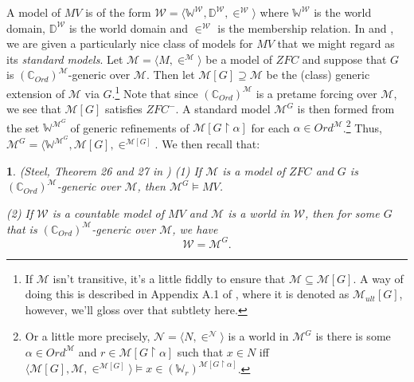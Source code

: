 \documentclass[10pt,a4paper]{amsart}
\numberwithin{equation}{section}
\numberwithin{figure}{section}
\theoremstyle{plain}
\theoremstyle{plain}
\newtheorem{fact}[thm]{\protect\factname}
\theoremstyle{plain}
\theoremstyle{plain}
\theoremstyle{remark}
\theoremstyle{plain}
\theoremstyle{definition}
\providecommand{\factname}{Fact}
\begin{document}
A model of $MV$ is of the form $\mathcal{W}=\langle\mathbb{W}^{\mathcal{W}},\mathbb{D}^{\mathcal{W}},\in^{\mathcal{W}}\rangle$
where $\mathbb{W}^{\mathcal{W}}$ is the world domain, $\mathbb{D}^{\mathcal{W}}$
is the world domain and $\in^{\mathcal{W}}$ is the membership relation.
In \citep{SteelGP} and \citep{MeadMadPGMV}, we are given a particularly
nice class of models for $MV$ that we might regard as its \emph{standard
models}. Let $\mathcal{M}=\langle M,\in^{\mathcal{M}}\rangle$ be
a model of $ZFC$ and suppose that $G$ is $(\mathbb{C}_{Ord})^{\mathcal{M}}$-generic
over $\mathcal{M}$. Then let $\mathcal{M}[G]\supseteq\mathcal{M}$
be the (class) generic extension of $\mathcal{M}$ via $G$.\footnote{If $\mathcal{M}$ isn't transitive, it's a little fiddly to ensure
that $\mathcal{M}\subseteq\mathcal{M}[G]$. A way of doing this is
described in Appendix A.1 of \citep{MeadMadPGMV}, where it is denoted
as $\mathcal{M}_{ult}[G]$, however, we'll gloss over that subtlety
here.} Note that since $(\mathbb{C}_{Ord})^{\mathcal{M}}$ is a pretame
forcing over $\mathcal{M}$, we see that $\mathcal{M}[G]$ satisfies
$ZFC^{-}$. A standard model $\mathcal{M}^{G}$ is then formed from
the set $\mathbb{W}^{\mathcal{M}^{G}}$ of generic refinements of
$\mathcal{M}[G\restriction\alpha]$ for each $\alpha\in Ord^{\mathcal{M}}$.\footnote{Or a little more precisely, $\mathcal{N}=\langle N,\in^{\mathcal{N}}\rangle$
is a world in $\mathcal{M}^{G}$ is there is some $\alpha\in Ord^{\mathcal{M}}$
and $r\in\mathcal{M}[G\restriction\alpha]$ such that $x\in N$ iff
$\langle\mathcal{M}[G],\mathcal{M},\in^{\mathcal{M}[G]}\rangle\models x\in(\mathbb{W}_{r})^{\mathcal{M}[G\restriction\alpha]}$. } Thus, $\mathcal{M}^{G}=\langle\mathbb{W}^{\mathcal{M}^{G}},\mathcal{M}[G],\in^{\mathcal{M}[G]}$.
We then recall that:
\begin{fact}
(Steel, Theorem 26 and 27 in \citep{MeadMadPGMV}) (1) If $\mathcal{M}$
is a model of $ZFC$ and $G$ is $(\mathbb{C}_{Ord})^{\mathcal{M}}$-generic
over $\mathcal{M}$, then $\mathcal{M}^{G}\models MV$.\label{fact:Steel,sound-comp}

(2) If $\mathcal{W}$ is a countable model of $MV$ and $\mathcal{M}$
is a world in $\mathcal{W}$, then for some $G$ that is $(\mathbb{C}_{Ord})^{\mathcal{M}}$-generic
over $\mathcal{M}$, we have\label{fact:Steel comp}
\[
\mathcal{W}=\mathcal{M}^{G}.
\]
\end{fact}
\end{document}
